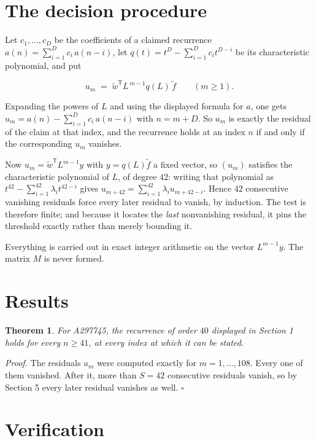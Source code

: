 \documentclass[11pt]{article}
\newtheorem{theorem}{Theorem}
\theoremstyle{definition}
\begin{document}
\section{The decision procedure}

Let $c_1,\dots,c_D$ be the coefficients of a claimed recurrence $a(n) = \sum_{i=1}^{D} c_i\,a(n-i)$, let $q(t) = t^{D} - \sum_{i=1}^{D} c_i t^{D-i}$ be its characteristic polynomial, and put

\[u_m \;=\; \tilde w^{\mathsf T} L^{\,m-1} q(L)\,\tilde f \qquad (m \ge 1).\]

Expanding the powers of $L$ and using the displayed formula for $a$, one gets $u_m = a(n) - \sum_{i=1}^{D} c_i\,a(n-i)$ with $n = m + D$. So $u_m$ is exactly the residual of the claim at that index, and the recurrence holds at an index $n$ if and only if the corresponding $u_m$ vanishes.

Now $u_m = \tilde w^{\mathsf T} L^{m-1} y$ with $y = q(L)\tilde f$ a fixed vector, so $(u_m)$ satisfies the characteristic polynomial of $L$, of degree $42$: writing that polynomial as $t^{42} - \sum_{i=1}^{42} \lambda_i t^{42-i}$ gives $u_{m+42} = \sum_{i=1}^{42} \lambda_i u_{m+42-i}$. Hence $42$ consecutive vanishing residuals force every later residual to vanish, by induction. The test is therefore finite; and because it locates the {\itshape last} nonvanishing residual, it pins the threshold exactly rather than merely bounding it.

Everything is carried out in exact integer arithmetic on the vector $L^{m-1}y$. The matrix $M$ is never formed.

\section{Results}

\begin{theorem} For A297745, the recurrence of order $40$ displayed in Section 1 holds for every $n \ge 41$, at every index at which it can be stated.\end{theorem}

{\itshape Proof.} The residuals $u_m$ were computed exactly for $m = 1,\dots,108$. Every one of them vanished. After it, more than $S = 42$ consecutive residuals vanish, so by Section 5 every later residual vanishes as well. $\square$

\section{Verification}
\end{document}
